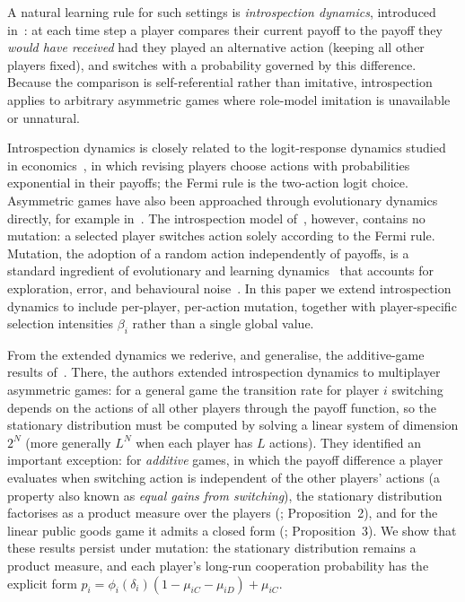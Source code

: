 \documentclass[11pt]{article}
\begin{document}
A natural learning rule for such settings is \emph{introspection dynamics}, introduced
in~\cite{couto2022introspection}: at each time step a player
compares their current payoff to the payoff they \emph{would have received} had they
played an alternative action (keeping all other players fixed), and switches with a
probability governed by this difference. Because the comparison is
self-referential rather than imitative, introspection applies to arbitrary asymmetric
games where role-model imitation is unavailable or unnatural.

Introspection dynamics is closely related to the logit-response dynamics
studied in economics~\cite{blume1993statistical,alosferrer2010logit}, in
which revising
players choose actions with probabilities exponential in their payoffs; the
Fermi rule is the two-action logit choice. Asymmetric games have also been
approached through evolutionary dynamics directly, for example
in~\cite{mcavoy2015asymmetric}. The introspection model
of~\cite{couto2022introspection,couto2023multiplayer}, however, contains no
mutation: a selected player switches action solely according to the Fermi
rule. Mutation, the adoption of a random action independently of payoffs, is
a standard ingredient of evolutionary and learning
dynamics~\cite{fudenberg2006evolutionary} that accounts for exploration,
error, and behavioural noise~\cite{traulsen2009exploration}. In this paper
we extend introspection dynamics to include per-player, per-action mutation,
together with player-specific selection intensities \(\beta_i\) rather than
a single global value.

From the extended dynamics we rederive, and generalise, the additive-game
results of~\cite{couto2023multiplayer}. There, the authors extended
introspection dynamics to multiplayer asymmetric games: for a general game
the transition rate for player \(i\) switching depends on the actions of all
other players through the payoff function, so the stationary distribution
must be computed by solving a linear system of dimension \(2^N\) (more
generally \(L^N\) when each player has \(L\) actions). They identified an
important exception: for \emph{additive} games, in which the payoff
difference a player evaluates when switching action is independent of the
other players' actions (a property also known as \emph{equal gains from
switching}), the stationary distribution factorises as a product measure
over the players (\cite{couto2023multiplayer}; Proposition~2), and for the
linear public goods game it admits a closed form
(\cite{couto2023multiplayer}; Proposition~3). We show that these results
persist under mutation: the stationary distribution remains a product
measure, and each player's long-run cooperation probability has the explicit
form \(p_i=\phi_i(\delta_i)(1-\mu_{iC}-\mu_{iD})+\mu_{iC}\).
\end{document}
